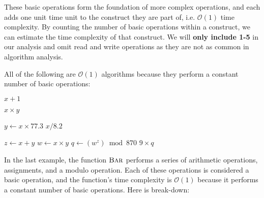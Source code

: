 These basic operations form the foundation of more complex operations, and each adds one unit time unit to the construct they are part of, i.e. $\mathcal{O}(1)$ time complexity. By counting the number of basic operations within a construct, we can estimate the time complexity of that construct. We will \textbf{only include 1-5 }in our analysis and omit read and write operations as they are not as common in algorithm analysis.

All of the following are $\mathcal{O}(1)$ algorithms because they perform a constant number of basic operations:

\begin{codebox}
    \li \Return $x + 1$
\end{codebox}

\begin{codebox}
    \li \Return $x \times y$
\end{codebox}

\begin{codebox}
    \li $y \gets x \times 77.3$
    \li \Return $x / 8.2$
\end{codebox}

\begin{codebox}
    \li $z \gets x + y$
    \li $w \gets x \times y$
    \li $q \gets (w^z) \bmod 870$
    \li \Return $9 \times q$
\end{codebox}

In the last example, the function $\proc{Bar}$ performs a series of arithmetic operations, assignments, and a modulo operation. Each of these operations is considered a basic operation, and the function's time complexity is $\mathcal{O}(1)$ because it performs a constant number of basic operations. Here is break-down:

